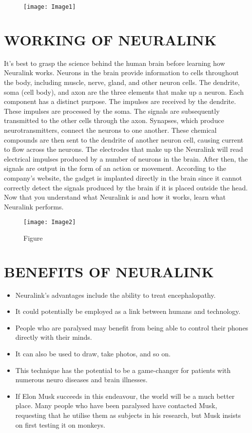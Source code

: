 \documentclass[12pt]{article}
\begin{document}
\begin{figure}
\centering
\texttt{[image: Image1]}
\caption{}
\end{figure}
\clearpage

\section{WORKING OF NEURALINK}

It's best to grasp the science behind the human brain before learning how Neuralink works. Neurons in the brain provide information to cells throughout the body, including muscle, nerve, gland, and other neuron cells. The dendrite, soma (cell body), and axon are the three elements that make up a neuron. Each component has a distinct purpose. The impulses are received by the dendrite. These impulses are processed by the soma. The signals are subsequently transmitted to the other cells through the axon. Synapses, which produce neurotransmitters, connect the neurons to one another. These chemical compounds are then sent to the dendrite of another neuron cell, causing current to flow across the neurons. The electrodes that make up the Neuralink will read electrical impulses produced by a number of neurons in the brain. After then, the signals are output in the form of an action or movement. According to the company's website, the gadget is implanted directly in the brain since it cannot correctly detect the signals produced by the brain if it is placed outside the head. Now that you understand what Neuralink is and how it works, learn what Neuralink performs.

\begin{figure}
\centering
\texttt{[image: Image2]}
\caption{Figure}
\end{figure}


\clearpage

\section{BENEFITS OF NEURALINK}
\begin{itemize}

\item Neuralink's advantages include the ability to treat encephalopathy.
\item It could potentially be employed as a link between humans and technology.
\item	People who are paralysed may benefit from being able to control their phones directly with their minds.
\item	It can also be used to draw, take photos, and so on.
\item	This technique has the potential to be a game-changer for patients with numerous neuro diseases and brain illnesses.
\item	If Elon Musk succeeds in this endeavour, the world will be a much better place. Many people who have been paralysed have contacted Musk, requesting that he utilise them as subjects in his research, but Musk insists on first testing it on monkeys.
\end{itemize}
\end{document}
